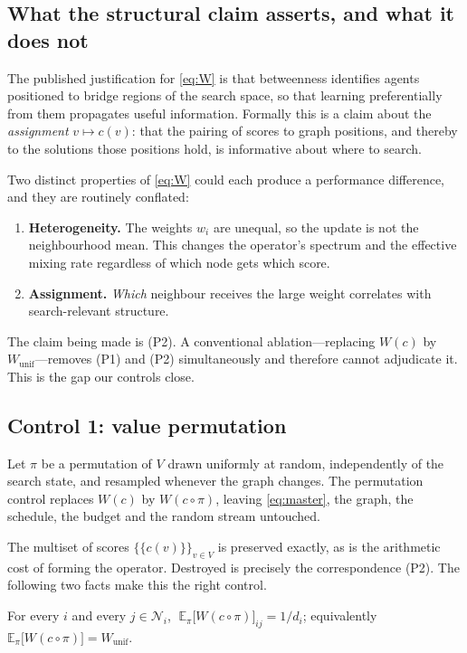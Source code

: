 \subsection{What the structural claim asserts, and what it does not}
\label{sec:claim}

The published justification for \eqref{eq:W} is that betweenness identifies
agents positioned to bridge regions of the search space, so that learning
preferentially from them propagates useful information. Formally this is a
claim about the \emph{assignment} $v \mapsto c(v)$: that the pairing of scores
to graph positions, and thereby to the solutions those positions hold, is
informative about where to search.

Two distinct properties of \eqref{eq:W} could each produce a performance
difference, and they are routinely conflated:
%
\begin{enumerate}
\item[(P1)] \textbf{Heterogeneity.} The weights $w_i$ are unequal, so the
  update is not the neighbourhood mean. This changes the operator's spectrum
  and the effective mixing rate regardless of which node gets which score.
\item[(P2)] \textbf{Assignment.} \emph{Which} neighbour receives the large
  weight correlates with search-relevant structure.
\end{enumerate}
%
The claim being made is (P2). A conventional ablation---replacing $W(c)$ by
$W_{\mathrm{unif}}$---removes (P1) and (P2) simultaneously and therefore
cannot adjudicate it. This is the gap our controls close.

\subsection{Control 1: value permutation}
\label{sec:perm}

Let $\pi$ be a permutation of $V$ drawn uniformly at random, independently of
the search state, and resampled whenever the graph changes. The permutation
control replaces $W(c)$ by $W(c \circ \pi)$, leaving \eqref{eq:master},
the graph, the schedule, the budget and the random stream untouched.

The multiset of scores $\{\!\{c(v)\}\!\}_{v \in V}$ is preserved exactly, as is
the arithmetic cost of forming the operator. Destroyed is precisely the
correspondence (P2). The following two facts make this the right control.

\begin{proposition}
\label{prop:mean}
For every $i$ and every $j \in \mathcal{N}_i$,
$\;\mathbb{E}_\pi\bigl[W(c \circ \pi)\bigr]_{ij} = 1/d_i$; equivalently
$\mathbb{E}_\pi\bigl[W(c \circ \pi)\bigr] = W_{\mathrm{unif}}$.
\end{proposition}

